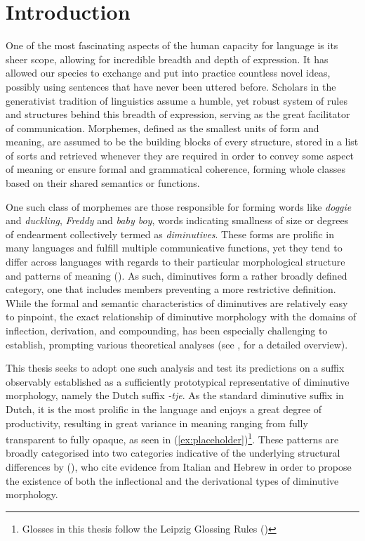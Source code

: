 \chapter{Introduction}\label{introduction}
\setcounter{page}{1}

One of the most fascinating aspects of the human capacity for language is its sheer scope, allowing for incredible breadth and depth of expression. It has allowed our species to exchange and put into practice countless novel ideas, possibly using sentences that have never been uttered before. Scholars in the generativist tradition of linguistics assume a humble, yet robust system of rules and structures behind this breadth of expression, serving as the great facilitator of communication. Morphemes, defined as the smallest units of form and meaning, are assumed to be the building blocks of every structure, stored in a list of sorts and retrieved whenever they are required in order to convey some aspect of meaning or ensure formal and grammatical coherence, forming whole classes based on their shared semantics or functions. 

One such class of morphemes are those responsible for forming words like \textit{doggie} and \textit{duckling}, \textit{Freddy} and \textit{baby boy}, words indicating smallness of size or degrees of endearment collectively termed as \textit{diminutives}. These forms are prolific in many languages and fulfill multiple communicative functions, yet they tend to differ across languages with regards to their particular morphological structure and patterns of meaning (\cite{Schneider+2003}). As such, diminutives form a rather broadly defined category, one that includes members preventing a more restrictive definition. While the formal and semantic characteristics of diminutives are relatively easy to pinpoint, the exact relationship of diminutive morphology with the domains of inflection, derivation, and compounding, has been especially challenging to establish, prompting various theoretical analyses (see \cite{Schneider+2003}, for a detailed overview).

This thesis seeks to adopt one such analysis and test its predictions on a suffix observably established as a sufficiently prototypical representative of diminutive morphology, namely the Dutch suffix \textit{-tje}. As the standard diminutive suffix in Dutch, it is the most prolific in the language and enjoys a great degree of productivity, resulting in great variance in meaning ranging from fully transparent to fully opaque, as seen in (\ref{ex:placeholder})\footnote{Glosses in this thesis follow the Leipzig Glossing Rules (\cite{leipzig+rules})}. These patterns are broadly categorised into two categories indicative of the underlying structural differences by \citeauthor{DeBelder+etal+2014} (\citeyear{DeBelder+etal+2014}), who cite evidence from Italian and Hebrew in order to propose the existence of both the inflectional and the derivational types of diminutive morphology. 

